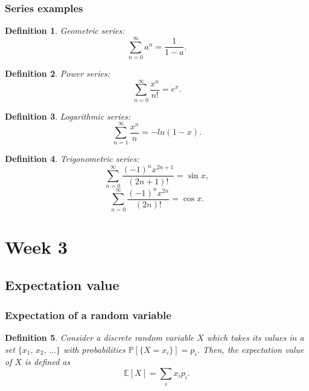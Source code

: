 \documentclass{article}
\newtheorem{definition}{Definition}
\newcommand{\Prob}{\mathbb{P}}
\newcommand{\E}{\mathbb{E}}
\begin{document}
\subsubsection{Series examples}
\begin{definition}
Geometric series:
    \begin{equation}
        \sum_{n=0}^\infty a^n = \frac{1}{1-a}.
    \end{equation}
\end{definition}
\begin{definition}
Power series:
    \begin{equation}
        \sum_{n=0}^\infty \frac{x^n}{n!}=e^x.
    \end{equation}    
\end{definition}
\begin{definition}
    Logarithmic series:
    \begin{equation}
        \sum_{n=1}^\infty \frac{x^n}{n} = -ln(1-x).
    \end{equation}
\end{definition}
\begin{definition}
    Trigonometric series:
    \begin{equation}
        \sum_{n=0}^\infty \frac{(-1)^n x^{2n+1}}{(2n+1)!} = \sin x,
    \end{equation}
    \begin{equation}
        \sum_{n=0}^\infty \frac{(-1)^n x^{2n}}{(2n)!} = \cos x.
    \end{equation}
\end{definition}

\section{Week 3}
\subsection{Expectation value}
\subsubsection{Expectation of a random variable}
\begin{definition}
    Consider a discrete random variable $X$ which takes its values in a set $\{ x_1,\,x_2,\,\ldots \}$ with probabilities $\Prob[\{X=x_i\}]=p_i$. Then, the expectation value of $X$ is defined as
    \begin{equation}
        \E[X] = \sum_i x_i p_i.
    \end{equation}
\end{definition}
\end{document}
